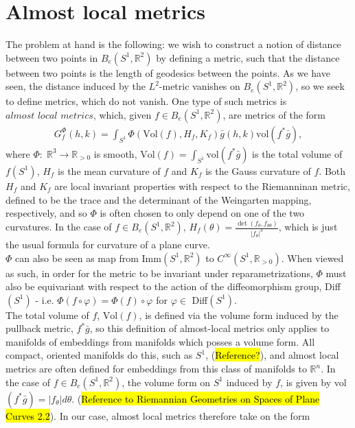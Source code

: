 \documentclass[a4,danish]{article}
\theoremstyle{break}
\theoremstyle{definition}
\theoremstyle{Break}
\newcommand{\R}{\mathbb{R}}
\renewcommand{\phi}{\varphi}
\begin{document}

\section*{Almost local metrics}
\label{sec:al-metrics}

The problem at hand is the following: we wish to construct a notion of distance between two points in $B_e(S^1,\R^2)$ by defining a metric, such that the distance between two points is the length of geodesics between the points. As we have seen, the distance induced by the $L^2$-metric vanishes on $B_e(S^1, \R^2)$, so we seek to define metrics, which do not vanish. One type of such metrics is $\textit{almost local metrics}$, which, given $f \in B_e(S^1, \R^2)$, are metrics of the form
\begin{align*}
G_f^\Phi (h,k) = \int_{S^1} \Phi(\text{Vol}(f), H_f, K_f) \bar{g}(h,k) \text{vol}(f^* \bar{g}),
\end{align*}
where $\Phi: \; \R^3 \rightarrow \R_{> 0}$ is smooth, $\text{Vol}(f) = \int_{S^1} \text{vol}(f^* \bar{g})$ is the total volume of $f(S^1)$, $H_f$ is the mean curvature of $f$ and $K_f$ is the Gauss curvature of $f$. Both $H_f$ and $K_f$ are local invariant properties with respect to the Riemanninan metric, defined to be the trace and the determinant of the Weingarten mapping, respectively, and so $\Phi$ is often chosen to only depend on one of the two curvatures. In the case of $f \in B_e(S^1, \R^2)$, $H_f(\theta) = \frac{\det(f_\theta, f_{\theta \theta})}{\left| f_\theta \right| ^3}$, which is just the usual formula for curvature of a plane curve.\\[0.2 cm]
$\Phi$ can also be seen as map from Imm$(S^1, \R^2)$ to $C^\infty (S^1, \R_{> 0})$. When viewed as such, in order for the metric to be invariant under reparametrizations, $\Phi$ must also be equivariant with respect to the action of the diffeomorphism group, Diff$(S^1)$ - i.e. $\Phi(f \circ \phi) = \Phi(f) \circ \phi$ for $\phi \in$ Diff$(S^1)$. \\[0.2 cm]
The total volume of $f$, $\text{Vol}(f)$, is defined via the volume form induced by the pullback metric, $f^*\bar{g}$, so this definition of almost-local metrics only applies to manifolds of embeddings from manifolds which posses a volume form. All compact, oriented manifolds do this, such as $S^1$, (\hl{Reference?}), and almost local metrics are often defined for embeddings from this class of manifolds to $\R^n$. In the case of $f \in B_e(S^1, \R^2)$, the volume form on $S^1$ induced by $f$, is given by vol$(f^*\bar{g}) = \left| f_\theta \right| d \theta$. (\hl{Reference to Riemannian Geometries on Spaces of Plane Curves 2.2}). In our case, almost local metrics therefore take on the form
\end{document}
